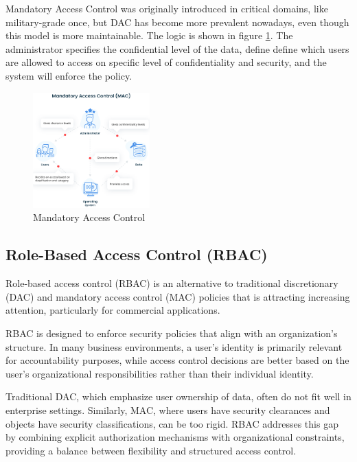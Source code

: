 Mandatory Access Control was originally introduced in critical
domains, like military-grade once, but DAC has become more prevalent
nowadays, even though this model is more maintainable.
The logic is shown in figure \ref{fig:mac}.
The administrator specifies the confidential level of the data, define
define which users are allowed to access on specific level of
confidentiality and security, and the system will enforce the policy.

\begin{figure}[H]
  \centering
  \includegraphics[width=0.4\textwidth]{img/mac.png}
  \caption{Mandatory Access Control}
  \label{fig:mac}
\end{figure}

\subsection{Role-Based Access Control (RBAC)}

Role-based access control (RBAC) is an alternative to traditional
discretionary (DAC) and mandatory access control (MAC) policies that
is attracting increasing attention, particularly for commercial
applications.



RBAC is designed to enforce security policies that align with an
organization’s structure. In many business environments, a user’s
identity is primarily relevant for accountability purposes, while
access control decisions are better based on the user’s organizational
responsibilities rather than their individual identity.

Traditional DAC, which emphasize user ownership of data, often do not
fit well in enterprise settings. Similarly, MAC, where users have
security clearances and objects have security classifications, can be
too rigid. RBAC addresses this gap by combining explicit authorization
mechanisms with organizational constraints, providing a balance
between flexibility and structured access control.

